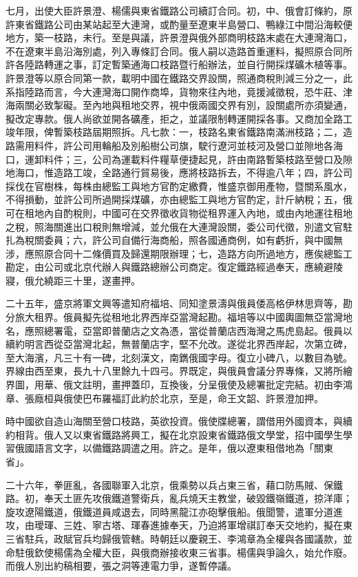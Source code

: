\begin{pinyinscope}
七月，出使大臣許景澄、楊儒與東省鐵路公司續訂合同。初，中、俄會訂條約，原許東省鐵路公司由某站起至大連灣，或酌量至遼東半島營口、鴨綠江中間沿海較便地方，築一枝路，未行。至是與議，許景澄與俄外部商明枝路末處在大連灣海口，不在遼東半島沿海別處，列入專條訂合同。俄人嗣以造路首重運料，擬照原合同所許各陸路轉運之事，訂定暫築通海口枝路暨行船辦法，並自行開採煤礦木植等事。許景澄等以原合同第一款，載明中國在鐵路交界設關，照通商稅則減三分之一，此系指陸路而言，今大連灣海口開作商埠，貨物來往內地，竟援減徵稅，恐牛莊、津海兩關必致掣礙。至內地與租地交界，視中俄兩國交界有別，設關處所亦須變通，擬改定專款。俄人尚欲並開各礦產，拒之，並議限制轉運開採各事。又商加全路工竣年限，俾暫築枝路屆期照拆。凡七款：一，枝路名東省鐵路南滿洲枝路；二，造路需用料件，許公司用輪船及別船樹公司旗，駛行遼河並枝河及營口並隙地各海口，運卸料件；三，公司為運載料件糧草便捷起見，許由南路暫築枝路至營口及隙地海口，惟造路工竣，全路通行貿易後，應將枝路拆去，不得逾八年；四，許公司採伐在官樹株，每株由總監工與地方官酌定繳費，惟盛京御用產物，暨關系風水，不得損動，並許公司所過開採煤礦，亦由總監工與地方官酌定，計斤納稅；五，俄可在租地內自酌稅則，中國可在交界徵收貨物從租界運入內地，或由內地運往租地之稅，照海關進出口稅則無增減，並允俄在大連灣設關，委公司代徵，別遣文官駐扎為稅關委員；六，許公司自備行海商船，照各國通商例，如有虧折，與中國無涉，應照原合同十二條價買及歸還期限辦理；七，造路方向所過地方，應俟總監工勘定，由公司或北京代辦人與鐵路總辦公司商定。復定鐵路經過奉天，應繞避陵寢，俄允繞距三十里，遂畫押。

二十五年，盛京將軍文興等遣知府福培、同知塗景濤與俄員倭高格伊林思齊等，勘分旅大租界。俄員擬先從租地北界西岸亞當灣起勘。福培等以中國輿圖無亞當灣地名，應照總署電，亞當即普蘭店之文為憑，當從普蘭店西海灣之馬虎島起。俄員以續約明言西從亞當灣北起，無普蘭店字，堅不允改。遂從北界西岸起，次第立碑，至大海濱，凡三十有一碑，北刻漢文，南鐫俄國字母。復立小碑八，以數目為號。界線由西至東，長九十八里餘九十四弓。界既定，與俄員會議分界專條，又將所繪界圖，用華、俄文註明，畫押蓋印，互換後，分呈俄使及總署批定完結。初由李鴻章、張廕桓與俄使巴布羅福訂此約於北京，至是，命王文韶、許景澄加押。

時中國欲自造山海關至營口枝路，英欲投資。俄使牒總署，謂借用外國資本，與續約相背。俄人又以東省鐵路將興工，擬在北京設東省鐵路俄文學堂，招中國學生學習俄國語言文字，以備鐵路調遣之用。許之。是年，俄以遼東租借地為「關東省」。

二十六年，拳匪亂，各國聯軍入北京，俄乘勢以兵占東三省，藉口防馬賊、保鐵路。初，奉天土匪先攻俄鐵道警衛兵，亂兵燒天主教堂，破毀鐵嶺鐵道，掠洋庫；旋攻遼陽鐵道，俄鐵道員咸退去，同時黑龍江亦砲擊俄船。俄聞警，遣軍分道進攻，由璦琿、三姓、寧古塔、琿春進據奉天，乃迫將軍增祺訂奉天交地約，擬在東三省駐兵，政賦官兵均歸俄管轄。時朝廷以慶親王、李鴻章為全權與各國議款，並命駐俄欽使楊儒為全權大臣，與俄商辦接收東三省事。楊儒與爭論久，始允作廢。而俄人別出約稿相要，張之洞等連電力爭，遂暫停議。


\end{pinyinscope}

